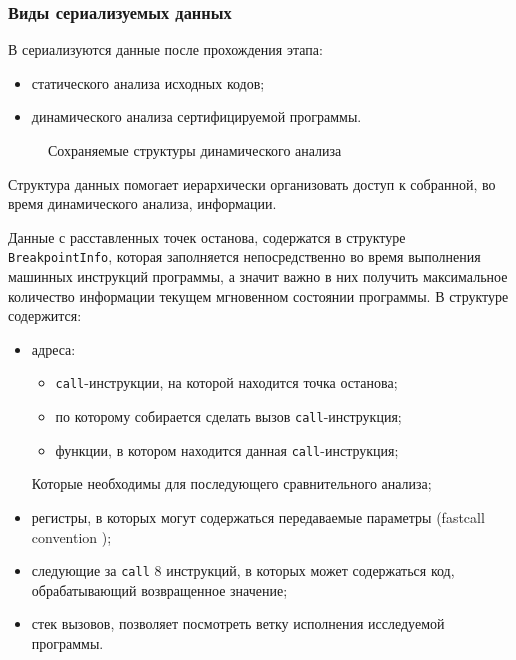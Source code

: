 \subsubsection{Виды сериализуемых данных}\label{sec:ch2/sec2/sub1/sub1}
В {\ProgModule} сериализуются данные после прохождения этапа:
\begin{itemize}
    \item статического анализа исходных кодов;
    \item динамического анализа сертифицируемой программы.
\end{itemize}

\begin{figure}[!htbp]
    \centerfloat{
        
    }
    \caption{Сохраняемые структуры динамического анализа \label{fig:dynamic-json}}
\end{figure}

Структура данных помогает иерархически организовать доступ к собранной, во время
динамического анализа, информации.

Данные с расставленных точек останова, содержатся в структуре \texttt{BreakpointInfo}, 
которая заполняется непосредственно во время выполнения машинных инструкций программы, а значит важно
в них получить максимальное количество информации текущем мгновенном состоянии программы.
В структуре содержится:
\begin{itemize}
    \item адреса:
            \begin{itemize}
                \item \texttt{call}-инструкции, на которой находится точка останова;
                \item по которому собирается сделать вызов \texttt{call}-инструкция;
                \item функции, в котором находится данная \texttt{call}-инструкция;
            \end{itemize}
            Которые необходимы для последующего сравнительного анализа;
        \item регистры, в которых могут содержаться передаваемые параметры (fastcall convention \autocite{fastcall});
        \item следующие за \texttt{call} 8 инструкций, в которых может содержаться код, обрабатывающий
            возвращенное значение;
        \item стек вызовов, позволяет посмотреть ветку исполнения исследуемой программы.
\end{itemize}

